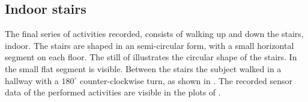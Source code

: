 \subsection{Indoor stairs}\label{subsec:indoor_stairs}
The final series of activities recorded, consists of walking up and down the stairs, indoor.
The stairs are shaped in an semi-circular form, with a small horizontal segment on each floor.
The still of  illustrates the circular shape of the stairs.
In  the small flat segment is visible.
Between the stairs the subject walked in a hallway with a $180^{\circ}$ counter-clockwise turn, as shown in .
The recorded sensor data of the performed activities are visible in the plots of .

